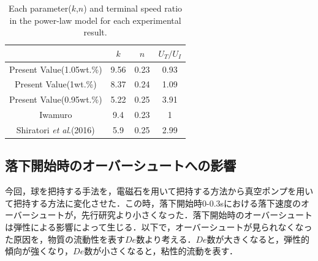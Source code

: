 \begin{table}[h]
    \centering
    \caption{Each parameter($k$,$n$) and terminal speed ratio in the power-law model for each experimental result.}
    \label{table:UT}
    \begin{tabular}{c|c|c|c} \hline
        & $k$ & $n$ & $U_T/U_{I}$ \\ \hline \hline
        Present Value(1.05wt.\%) & 9.56 & 0.23 & 0.93\\
        Present Value(1wt.\%) & 8.37 & 0.24 & 1.09\\
        Present Value(0.95wt.\%) & 5.22 & 0.25 & 3.91\\
        Iwamuro\cite{ref:8} & 9.4 & 0.23 & 1\\
        Shiratori \textit{et al}.(2016)\cite{ref:10} & 5.9 & 0.25 & 2.99\\ \hline
    \end{tabular}
\end{table}

\newpage

\subsection{落下開始時のオーバーシュートへの影響}
\label{sec:dis-de}

今回，球を把持する手法を，電磁石を用いて把持する方法から真空ポンプを用いて把持する方法に変化させた．この時，落下開始時0-0.3sにおける落下速度のオーバーシュートが，先行研究\cite{ref:8,ref:9}より小さくなった．落下開始時のオーバーシュートは弾性による影響によって生じる\cite{ref:12}．以下で，オーバーシュートが見られなくなった原因を，物質の流動性を表す$De$数より考える．$De$数が大きくなると，弾性的傾向が強くなり，$De$数が小さくなると，粘性的流動を表す．

